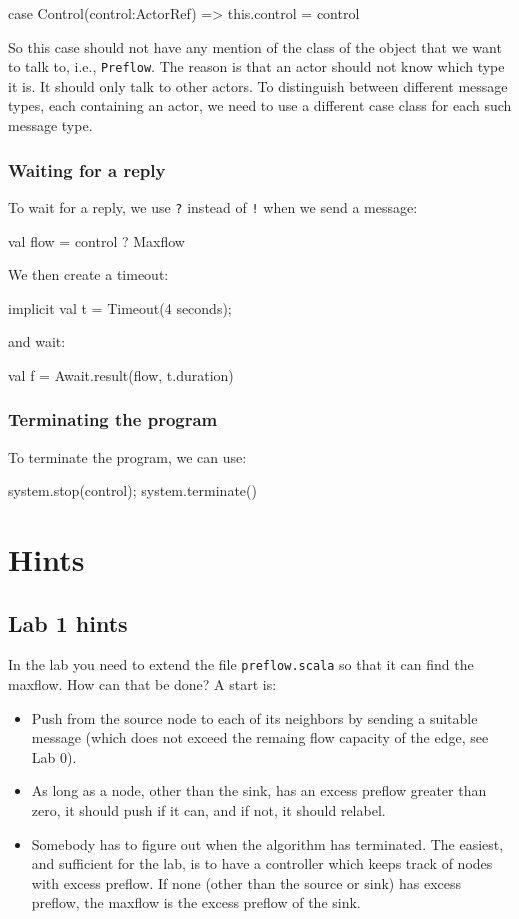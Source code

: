 \documentclass{forsete}
\begin{document}
{\begin{ccode}
case Control(control:ActorRef)	=> this.control = control
\end{ccode}
So this case should not have any mention of the class of the object that we want to talk to, i.e., {\tt Preflow}.
The reason is that an actor should not know which type it is. It should only talk to other actors.
To distinguish between different message types, each containing an actor, we need to use a 
different case class for each such message type.

\subsubsection*{Waiting for a reply}
To wait for a reply, we use \verb.?. instead of \verb.!. when we send a message:

\begin{ccode}
val flow = control ? Maxflow
\end{ccode}
We then create a timeout:
\begin{ccode}
implicit val t = Timeout(4 seconds);
\end{ccode}
and wait:
\begin{ccode}
val f = Await.result(flow, t.duration)
\end{ccode}
\subsubsection*{Terminating the program}
To terminate the program, we can use:
\begin{ccode}
system.stop(control);
system.terminate()
\end{ccode}

\section{Hints}
\subsection*{Lab 1 hints}
In the lab you need to extend the file \verb!preflow.scala! so that it can find the maxflow.
How can that be done? A start is:

\begin{itemize}
\item Push from the source node to each of its neighbors by sending a suitable message (which does not exceed
the remaing flow capacity of the edge, see Lab 0).
\item As long as a node, other than the sink, has an excess preflow greater than zero, it should 
push if it can, and if not, it should relabel.
\item Somebody has to figure out when the algorithm has terminated. The easiest, and sufficient for the lab,
is to have a controller which keeps track of nodes with excess preflow. If none (other than the source or sink)
has excess preflow, the maxflow is the excess preflow of the sink.
\end{itemize}

}
\end{document}
